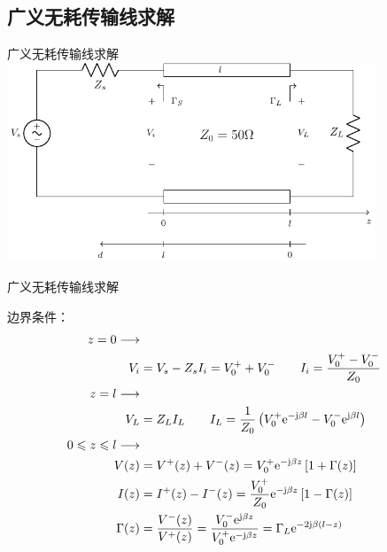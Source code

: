 \subsection{广义无耗传输线求解}


\begin{frame}{广义无耗传输线求解}
  \centering
  \includegraphics[width=11cm]{fig3-16.pdf}
\end{frame}


\begin{frame}{广义无耗传输线求解}

  \flushleft
  边界条件：
  \begin{align}
    z=0\longrightarrow   \notag                                                                                      \\
    V_i & =V_s-Z_sI_i=V_0^++V_0^- \qquad   I_i =\frac{V_0^+-V_0^-}{Z_0} \notag                                                                          \\
    z=l\longrightarrow              \notag                                                                           \\
    V_L & =Z_LI_L    \qquad      I_L =\frac{1}{Z_0}\left( V_0^+\mathrm{e}^{-\mathrm{j}\beta l}-V_0^-\mathrm{e}^{\mathrm{j}\beta l}\right) \notag\\
    0\leqslant z \leqslant l \longrightarrow  \notag                                                                                                                         \\
    V(z)      & = V^+(z)+V^-(z) = V_0^+\mathrm{e}^{-\mathrm{j}\beta z}\left[ 1+\Gamma(z)\right]\label{eqn1}                                                                             \\
    I(z)      & = I^+(z)-I^-(z) = \frac{V_0^+}{Z_0}\mathrm{e}^{-\mathrm{j}\beta z}\left[1-\Gamma(z)\right]\label{eqn2}                                                                   \\
    \Gamma(z) & =\dfrac{V^-(z)}{V^+(z)}=\dfrac{V_0^-\mathrm{e}^{\mathrm{j}\beta z}}{V_0^+\mathrm{e}^{-\mathrm{j}\beta z}}=\Gamma_L\mathrm{e}^{-2\mathrm{j}\beta(l-z)} \notag
  \end{align}

\end{frame}

